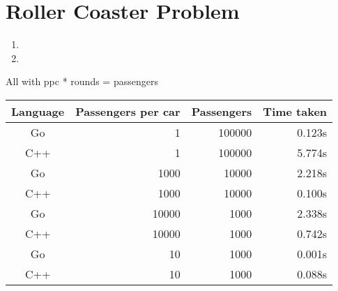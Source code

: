 \documentclass[11pt]{article}
\begin{document}
\section{Roller Coaster Problem}
\begin{enumerate}
	\item
	\item
\end{enumerate}

All with ppc * rounds = passengers

\begin{tabular}{c r r r}
Language    & Passengers per car & Passengers & Time taken \\
\toprule
Go 			& 1 & 100000 & 0.123s \\
C++         & 1 & 100000 & 5.774s \\
\cmidrule{1-4}
Go 			& 1000 & 10000 & 2.218s \\
C++         & 1000 & 10000 & 0.100s \\
\cmidrule{1-4}
Go 			& 10000 & 1000 & 2.338s \\
C++         & 10000 & 1000 & 0.742s \\
\cmidrule{1-4}
Go 			& 10 & 1000 & 0.001s \\
C++         & 10 & 1000 & 0.088s \\
\end{tabular}
\end{document}
